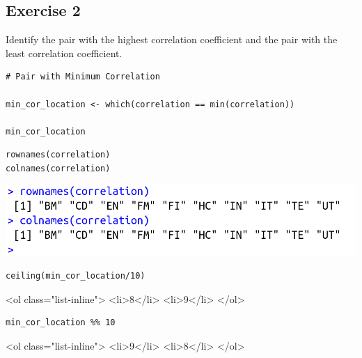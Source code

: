 \documentclass[a4paper,12pt]{article}
\begin{document}
\newpage 
\subsection*{Exercise 2}
\noindent Identify the pair with the highest correlation coefficient and the pair with the least correlation coefficient. 



\begin{framed} \begin{verbatim}
# Pair with Minimum Correlation 

min_cor_location <- which(correlation == min(correlation))

min_cor_location
\end{verbatim}\end{framed} 




\begin{framed} \begin{verbatim}
rownames(correlation)
colnames(correlation)
\end{verbatim}\end{framed} 

\includegraphics[scale=0.45]{00-D1/images/indices_rownames.png}





\begin{framed} \begin{verbatim}
ceiling(min_cor_location/10)
\end{verbatim}\end{framed} 


<ol class="list-inline">
	<li>8</li>
	<li>9</li>
</ol>




\begin{framed} \begin{verbatim}
min_cor_location %% 10
\end{verbatim}\end{framed} 


<ol class="list-inline">
	<li>9</li>
	<li>8</li>
</ol>
\end{document}
